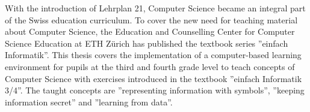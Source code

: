 With the introduction of Lehrplan 21, Computer Science became an integral part of the Swiss education curriculum. To cover the new need for teaching material about Computer Science, the Education and Counselling Center for Computer Science Education at ETH Zürich has published the textbook series ''einfach Informatik''. 
This thesis covers the implementation of a computer-based learning environment for pupils at the third and fourth grade level to teach concepts of Computer Science with exercises introduced in the textbook ''einfach Informatik 3/4''. The taught concepts are ''representing information with symbols'', ''keeping information secret'' and ''learning from data''.